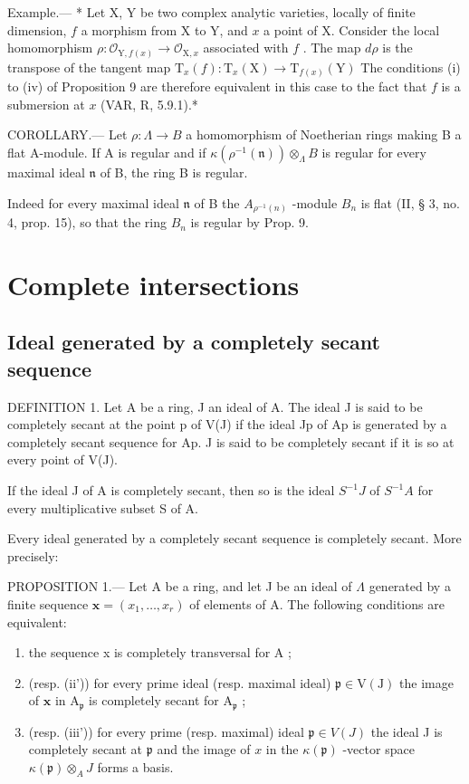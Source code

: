 Example.--- * Let X, Y be two complex analytic varieties, locally of finite dimension, \(f\) a morphism from X to Y, and \(x\) a point of X. Consider the local homomorphism \(\rho: \mathcal{O}_{\mathrm{Y}, f(x)} \to \mathcal{O}_{\mathrm{X}, x}\) associated with \(f\) . The map \(d\rho\) is the transpose of the tangent map \(\mathrm{T}_x(f): \mathrm{T}_x(\mathrm{X}) \to \mathrm{T}_{f(x)}(\mathrm{Y})\) The conditions (i) to (iv) of Proposition 9 are therefore equivalent in this case to the fact that \(f\) is a submersion at \(x\) (VAR, R, 5.9.1).*

COROLLARY.--- Let \(\rho: \Lambda \to B\) a homomorphism of Noetherian rings making B a flat A-module. If A is regular and if \(\kappa(\rho^{-1}(\mathfrak{n})) \otimes_{\Lambda} B\) is regular for every maximal ideal \(\mathfrak{n}\) of B, the ring B is regular.

Indeed for every maximal ideal \(\mathfrak{n}\) of B the \(A_{\rho^{-1}(n)}\) -module \(B_{n}\) is flat (II, § 3, no. 4, prop. 15), so that the ring \(B_{n}\) is regular by Prop. 9.

\section{Complete intersections}

\subsection{Ideal generated by a completely secant sequence}

DEFINITION 1. Let A be a ring, J an ideal of A. The ideal J is said to be completely secant at the point p of V(J) if the ideal Jp of Ap is generated by a completely secant sequence for Ap. J is said to be completely secant if it is so at every point of V(J).

If the ideal J of A is completely secant, then so is the ideal \(S^{-1}J\) of \(S^{-1}A\) for every multiplicative subset S of A.

Every ideal generated by a completely secant sequence is completely secant. More precisely:

PROPOSITION 1.--- Let A be a ring, and let J be an ideal of \(\Lambda\) generated by a finite sequence \(\mathbf{x} = (x_1, \ldots, x_r)\) of elements of A. The following conditions are equivalent:

\begin{enumerate}
\def\labelenumi{(\roman{enumi})}
\item
  the sequence x is completely transversal for A ;
\item
  (resp. (ii')) for every prime ideal (resp. maximal ideal) \(\mathfrak{p} \in \mathrm{V}(\mathrm{J})\) the image of \(\mathbf{x}\) in \(\mathrm{A}_{\mathfrak{p}}\) is completely secant for \(\mathrm{A}_{\mathfrak{p}}\) ;
\item
  (resp. (iii')) for every prime (resp. maximal) ideal \(\mathfrak{p} \in V(J)\) the ideal J is completely secant at \(\mathfrak{p}\) and the image of \(x\) in the \(\kappa(\mathfrak{p})\) -vector space \(\kappa(\mathfrak{p}) \otimes_{A} J\) forms a basis.
\end{enumerate}

